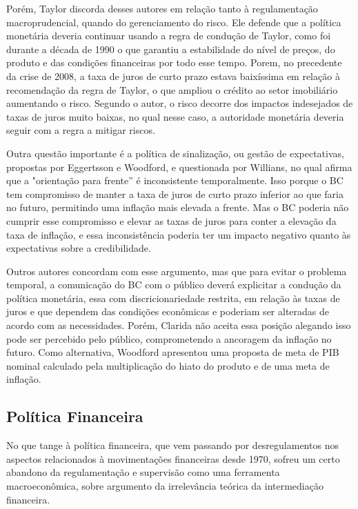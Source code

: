 \documentclass[report]{uftex}
\begin{document}
Porém, Taylor discorda desses autores em relação tanto à regulamentação macroprudencial, quando do gerenciamento do risco. Ele defende que a política monetária deveria continuar usando a regra de condução de Taylor, como foi durante a década de 1990 o que garantiu a estabilidade do nível de preços, do produto e das condições financeiras por todo esse tempo. Porem, no precedente da crise de 2008, a taxa de juros de curto prazo estava baixíssima em relação à recomendação da regra de Taylor, o que ampliou o crédito ao setor imobiliário aumentando o risco. Segundo o autor, o risco decorre dos impactos indesejados de taxas de juros muito baixas, no qual nesse caso, a autoridade monetária deveria seguir com a regra a mitigar riscos. 

Outra questão importante é a política de sinalização, ou gestão de expectativas, propostas por Eggertsson e Woodford, e questionada por Willians, no qual afirma que a "orientação para frente” é inconsistente temporalmente. Isso porque o BC tem compromisso de manter a taxa de juros de curto prazo inferior ao que faria no futuro, permitindo uma inflação mais elevada a frente. Mas o BC poderia não cumprir esse compromisso e elevar as taxas de juros para conter a elevação da taxa de inflação, e essa inconsistência poderia ter um impacto negativo quanto às expectativas sobre a credibilidade.

Outros autores concordam com esse argumento, mas que para evitar o problema temporal, a comunicação do BC com o público deverá explicitar a condução da política monetária, essa com discricionariedade restrita, em relação às taxas de juros e que dependem das condições econômicas e poderiam ser alteradas de acordo com as necessidades. Porém, Clarida não aceita essa posição alegando isso pode ser percebido pelo público, comprometendo a ancoragem da inflação no futuro. Como alternativa, Woodford apresentou uma proposta de meta de PIB nominal calculado pela multiplicação do hiato do produto e de uma meta de inflação.

\subsection{Política Financeira}

No que tange à política financeira, que vem passando por desregulamentos nos aspectos relacionados à movimentações financeiras desde 1970, sofreu um certo abandono da regulamentação e supervisão como uma ferramenta macroeconômica, sobre argumento da irrelevância teórica da intermediação financeira. 
\end{document}

